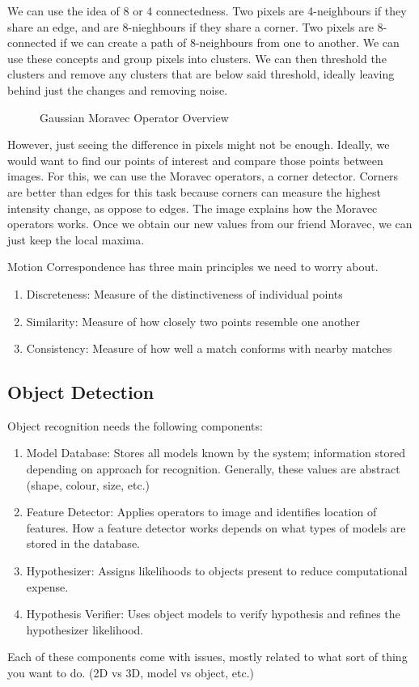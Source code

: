 We can use the idea of 8 or 4 connectedness. Two pixels are 4-neighbours if they share an edge, and are 8-nieghbours if they share a corner. Two pixels are 8-connected if we can create a path of 8-neighbours from one to another. We can use these concepts and group pixels into clusters. We can then threshold the clusters and remove any clusters that are below said threshold, ideally leaving behind just the changes and removing noise.
\begin{figure}[!htb]
	\caption{\label{fig:moravec}Gaussian Moravec Operator Overview}
\end{figure}
However, just seeing the difference in pixels might not be enough. Ideally, we would want to find our points of interest and compare those points between images. For this, we can use the Moravec operators, a corner detector. Corners are better than edges for this task because corners can measure the highest intensity change, as oppose to edges. The image explains how the Moravec operators works. Once we obtain our new values from our friend Moravec, we can just keep the local maxima.\newline

Motion Correspondence has three main principles we need to worry about.
\begin{enumerate}
	\item Discreteness: Measure of the distinctiveness of individual points
	\item Similarity: Measure of how closely two points resemble one another
	\item Consistency: Measure of how well a match conforms with nearby matches
\end{enumerate}
\subsection{Object Detection}
Object recognition needs the following components:
\begin{enumerate}
	\item Model Database: Stores all models known by the system; information stored depending on approach for recognition. Generally, these values are abstract (shape, colour, size, etc.)
	\item Feature Detector: Applies operators to image and identifies location of features. How a feature detector works depends on what types of models are stored in the database.
	\item Hypothesizer: Assigns likelihoods to objects present to reduce computational expense.
	\item Hypothesis Verifier: Uses object models to verify hypothesis and refines the hypothesizer likelihood. 
\end{enumerate}
Each of these components come with issues, mostly related to what sort of thing you want to do. (2D vs 3D, model vs object, etc.)